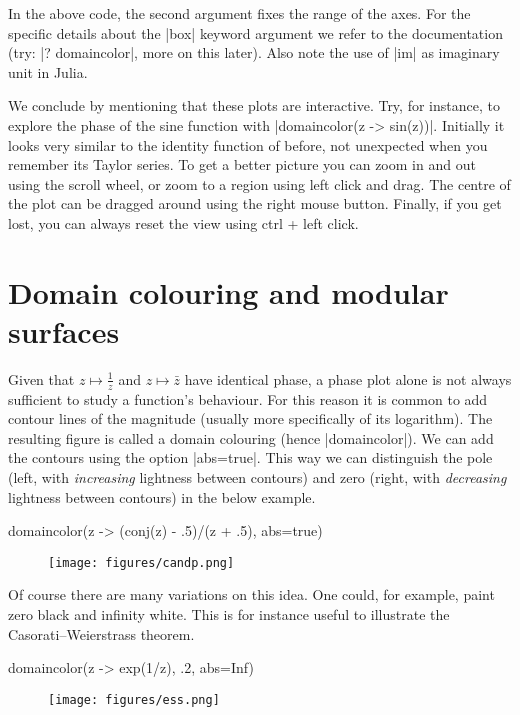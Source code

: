 \documentclass[a4paper]{article}
\begin{document}
In the above code, the second argument fixes the range of the axes. For the
specific details about the \jlv|box| keyword argument we refer to the
documentation (try: \jlv|? domaincolor|, more on this later). Also note the use
of \jlv|im| as imaginary unit in Julia.

We conclude by mentioning that these plots are interactive. Try, for instance,
to explore the phase of the sine function with \jlv|domaincolor(z -> sin(z))|.
Initially it looks very similar to the identity function of before, not
unexpected when you remember its Taylor series.  To get a better picture you can
zoom in and out using the scroll wheel, or zoom to a region using left click and
drag.  The centre of the plot can be dragged around using the right mouse
button.  Finally, if you get lost, you can always reset the view using ctrl +
left click.

\section{Domain colouring and modular surfaces}

Given that $z \mapsto \frac{1}{z}$ and $z \mapsto \bar{z}$ have identical phase,
a phase plot alone is not always sufficient to study a function's behaviour.
For this reason it is common to add contour lines of the magnitude (usually more
specifically of its logarithm). The resulting figure is called a domain
colouring (hence \jlv|domaincolor|). We can add the contours using the option
\jlv|abs=true|. This way we can distinguish the pole (left, with
\emph{increasing} lightness between contours) and zero (right, with
\emph{decreasing} lightness between contours) in the below example.

\begin{juliaverbatim}
	domaincolor(z -> (conj(z) - .5)/(z + .5), abs=true)
\end{juliaverbatim}
\begin{figure}[H]
	\centering
	\texttt{[image: figures/candp.png]}
\end{figure}

Of course there are many variations on this idea. One could, for example, paint
zero black and infinity white. This is for instance useful to illustrate the
Casorati--Weierstrass theorem.

\begin{juliaverbatim}
	domaincolor(z -> exp(1/z), .2, abs=Inf)
\end{juliaverbatim}
\begin{figure}[H]
	\centering
	\texttt{[image: figures/ess.png]}
\end{figure}
\end{document}
